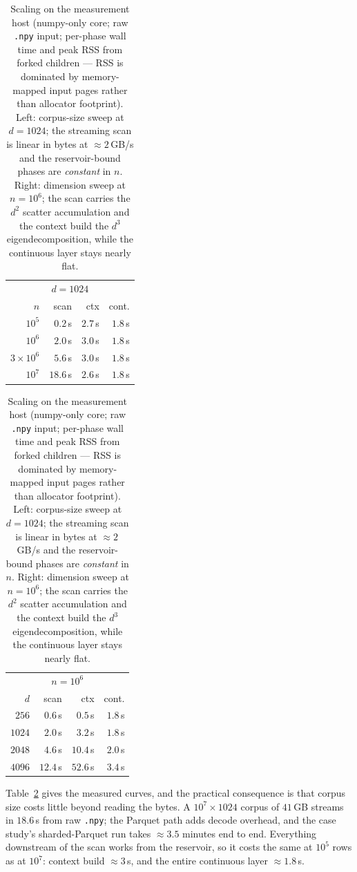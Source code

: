 \documentclass[11pt,letterpaper]{article}
\begin{document}
\begin{table}[t]
\centering
\caption{Scaling on the measurement host (numpy-only core; raw \texttt{.npy}
input; per-phase wall time and peak RSS from forked children --- RSS is
dominated by memory-mapped input pages rather than allocator footprint). Left:
corpus-size sweep at $d = 1024$; the streaming scan is linear in bytes at
$\approx 2$\,GB/s and the reservoir-bound phases are \emph{constant} in $n$.
Right: dimension sweep at $n = 10^6$; the scan carries the $d^2$ scatter
accumulation and the context build the $d^3$ eigendecomposition, while the
continuous layer stays nearly flat.}
\label{tab:scaling}
\small
\setlength{\tabcolsep}{4.5pt}
\begin{tabular}{rrrr}
\toprule
\multicolumn{4}{c}{$d = 1024$}\\
$n$ & scan & ctx & cont.\\
\midrule
$10^5$ & $0.2$\,s & $2.7$\,s & $1.8$\,s\\
$10^6$ & $2.0$\,s & $3.0$\,s & $1.8$\,s\\
$3{\times}10^6$ & $5.6$\,s & $3.0$\,s & $1.8$\,s\\
$10^7$ & $18.6$\,s & $2.6$\,s & $1.8$\,s\\
\bottomrule
\end{tabular}
\hspace{1.6em}
\begin{tabular}{rrrr}
\toprule
\multicolumn{4}{c}{$n = 10^6$}\\
$d$ & scan & ctx & cont.\\
\midrule
$256$ & $0.6$\,s & $0.5$\,s & $1.8$\,s\\
$1024$ & $2.0$\,s & $3.2$\,s & $1.8$\,s\\
$2048$ & $4.6$\,s & $10.4$\,s & $2.0$\,s\\
$4096$ & $12.4$\,s & $52.6$\,s & $3.4$\,s\\
\bottomrule
\end{tabular}
\end{table}

Table~\ref{tab:scaling} gives the measured curves, and the practical
consequence is that corpus size costs little beyond reading the bytes. A
$10^7 \times 1024$ corpus of $41$\,GB streams in $18.6$\,s from raw
\texttt{.npy}; the Parquet path adds decode overhead, and the case
study's sharded-Parquet run takes $\approx 3.5$ minutes end to end.
Everything downstream of the scan works from the reservoir, so it costs
the same at $10^5$ rows as at $10^7$: context build $\approx 3$\,s, and
the entire continuous layer $\approx 1.8$\,s.
\end{document}
